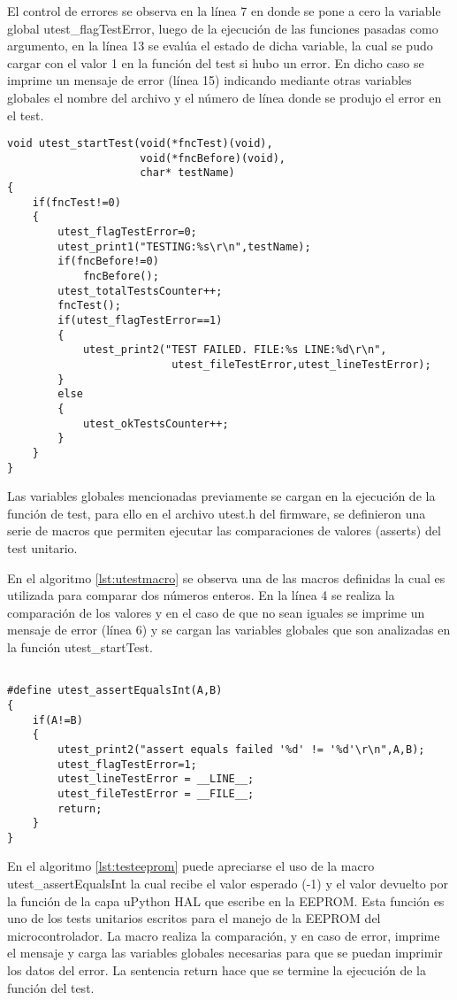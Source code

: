 El control de errores se observa en la línea 7 en donde se pone a cero la variable global utest\_flagTestError, luego de la ejecución de las funciones pasadas como argumento, en la línea 13 se evalúa el estado de dicha variable, la cual se pudo cargar con el valor 1 en la función del test si hubo un error. En dicho caso se imprime un mensaje de error (línea 15) indicando mediante otras variables globales el nombre del archivo y el número de línea donde se produjo el error en el test.

\begin{lstlisting}[label={lst:utest},caption=Función que ejecuta un test unitario incluida en el archivo utest.c del firmware.]
void utest_startTest(void(*fncTest)(void),
                     void(*fncBefore)(void),
                     char* testName)
{
	if(fncTest!=0)
	{
		utest_flagTestError=0;
		utest_print1("TESTING:%s\r\n",testName);
		if(fncBefore!=0)
			fncBefore();
		utest_totalTestsCounter++;
		fncTest();
		if(utest_flagTestError==1)
		{
			utest_print2("TEST FAILED. FILE:%s LINE:%d\r\n",
			              utest_fileTestError,utest_lineTestError);
		}
		else
		{
			utest_okTestsCounter++;
		}
	}
} 
\end{lstlisting}

Las variables globales mencionadas previamente se cargan en la ejecución de la función de test, para ello en el archivo utest.h del firmware, se definieron una serie de macros que permiten ejecutar las comparaciones de valores (asserts) del test unitario.

En el algoritmo \ref{lst:utestmacro} se observa una de las macros definidas la cual es utilizada para comparar dos números enteros. En la línea 4 se realiza la comparación de los valores y en el caso de que no sean iguales se imprime un mensaje de error (línea 6) y se cargan las variables globales que son analizadas en la función utest\_startTest.

\begin{lstlisting}[label={lst:utestmacro},caption=Ejemplo de una macro assert incluida en el archivo utest.h del firmware.]

#define utest_assertEqualsInt(A,B)	
{ 
	if(A!=B)
	{ 
		utest_print2("assert equals failed '%d' != '%d'\r\n",A,B); 
		utest_flagTestError=1; 
		utest_lineTestError = __LINE__;  
		utest_fileTestError = __FILE__;
		return; 
	} 
}
\end{lstlisting}

En el algoritmo \ref{lst:testeeprom} puede apreciarse el uso de la macro utest\_assertEqualsInt la cual recibe el valor esperado (-1) y el valor devuelto por la función de la capa uPython HAL que escribe en la EEPROM. Esta función es uno de los tests unitarios escritos para el manejo de la EEPROM del microcontrolador. La macro realiza la comparación, y en caso de error, imprime el mensaje y carga las variables globales necesarias para que se puedan imprimir los datos del error. La sentencia return hace que se termine la ejecución de la función del test.

